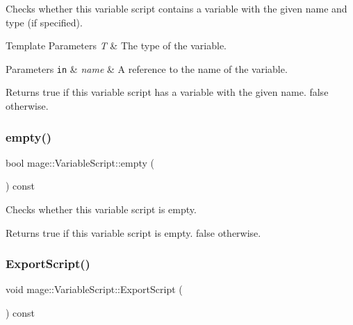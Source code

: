 Checks whether this variable script contains a variable with the given name and type (if specified).


\begin{DoxyTemplParams}{Template Parameters}
{\em T} & The type of the variable. \\
\hline
\end{DoxyTemplParams}

\begin{DoxyParams}[1]{Parameters}
\mbox{\tt in}  & {\em name} & A reference to the name of the variable. \\
\hline
\end{DoxyParams}
\begin{DoxyReturn}{Returns}
{\ttfamily true} if this variable script has a variable with the given name. {\ttfamily false} otherwise. 
\end{DoxyReturn}
\mbox{\label{classmage_1_1_variable_script_a8a3f47783455cd6264dfc996887fd0f0}} 
\subsubsection{\texorpdfstring{empty()}{empty()}}
{\footnotesize\ttfamily bool mage\+::\+Variable\+Script\+::empty (\begin{DoxyParamCaption}{ }\end{DoxyParamCaption}) const\hspace{0.3cm}{\ttfamily [noexcept]}}

Checks whether this variable script is empty.

\begin{DoxyReturn}{Returns}
{\ttfamily true} if this variable script is empty. {\ttfamily false} otherwise. 
\end{DoxyReturn}
\mbox{\label{classmage_1_1_variable_script_ab12b7f789f6af2b301ff350fa401b324}} 
\subsubsection{\texorpdfstring{Export\+Script()}{ExportScript()}\hspace{0.1cm}{\footnotesize\ttfamily [1/2]}}
{\footnotesize\ttfamily void mage\+::\+Variable\+Script\+::\+Export\+Script (\begin{DoxyParamCaption}{ }\end{DoxyParamCaption}) const}


